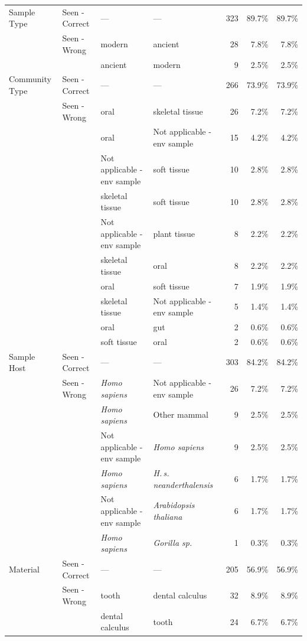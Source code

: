 \begin{longtable}{@{}llp{2.8cm}p{2.8cm}rrr@{}}
\bottomrule
\endlastfoot
Sample Type & Seen - Correct & --- & --- & 323 & 89.7\% & 89.7\% \\
  & Seen - Wrong & modern & ancient & 28 & 7.8\% & 7.8\% \\
  &  & ancient & modern & 9 & 2.5\% & 2.5\% \\
\addlinespace
Community Type & Seen - Correct & --- & --- & 266 & 73.9\% & 73.9\% \\
  & Seen - Wrong & oral & skeletal tissue & 26 & 7.2\% & 7.2\% \\
  &  & oral & Not applicable - env sample & 15 & 4.2\% & 4.2\% \\
  &  & Not applicable - env sample & soft tissue & 10 & 2.8\% & 2.8\% \\
  &  & skeletal tissue & soft tissue & 10 & 2.8\% & 2.8\% \\
  &  & Not applicable - env sample & plant tissue & 8 & 2.2\% & 2.2\% \\
  &  & skeletal tissue & oral & 8 & 2.2\% & 2.2\% \\
  &  & oral & soft tissue & 7 & 1.9\% & 1.9\% \\
  &  & skeletal tissue & Not applicable - env sample & 5 & 1.4\% & 1.4\% \\
  &  & oral & gut & 2 & 0.6\% & 0.6\% \\
  &  & soft tissue & oral & 2 & 0.6\% & 0.6\% \\
\addlinespace
Sample Host & Seen - Correct & --- & --- & 303 & 84.2\% & 84.2\% \\
  & Seen - Wrong & \textit{Homo sapiens} & Not applicable - env sample & 26 & 7.2\% & 7.2\% \\
  &  & \textit{Homo sapiens} & Other mammal & 9 & 2.5\% & 2.5\% \\
  &  & Not applicable - env sample & \textit{Homo sapiens} & 9 & 2.5\% & 2.5\% \\
  &  & \textit{Homo sapiens} & \textit{H.\,s.\,neanderthalensis} & 6 & 1.7\% & 1.7\% \\
  &  & Not applicable - env sample & \textit{Arabidopsis thaliana} & 6 & 1.7\% & 1.7\% \\
  &  & \textit{Homo sapiens} & \textit{Gorilla sp.} & 1 & 0.3\% & 0.3\% \\
\addlinespace
Material & Seen - Correct & --- & --- & 205 & 56.9\% & 56.9\% \\
  & Seen - Wrong & tooth & dental calculus & 32 & 8.9\% & 8.9\% \\
  &  & dental calculus & tooth & 24 & 6.7\% & 6.7\% \\

\end{longtable}
